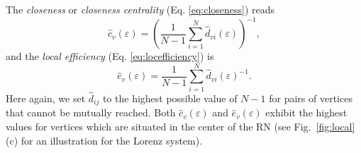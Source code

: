 The \textit{closeness} or \textit{closeness centrality} (Eq. \eqref{eq:closeness}) reads 
\begin{equation}
\hat{c}_v(\varepsilon)=\left(\frac{1}{N-1}\sum_{i=1}^N \hat{d}_{vi}(\varepsilon) \right)^{-1},
\label{eq:closenessRN}
\end{equation}
\noindent
and the \textit{local efficiency} (Eq. \eqref{eq:locefficiency}) is 
\begin{equation}
\hat{e}_v(\varepsilon)=\frac{1}{N-1}\sum_{i=1}^N \hat{d}_{vi}(\varepsilon)^{-1}. 
\label{eq:locefficiencyRN}
\end{equation}
\noindent
Here again, we set $\hat{d}_{ij}$ to the highest possible value of $N-1$ for pairs of vertices that cannot be mutually reached. Both $\hat{c}_v(\varepsilon)$ and $\hat{e}_v(\varepsilon)$ exhibit the highest values for vertices which are situated in the center of the RN (see Fig.~\ref{fig:local}(c) for an illustration for the Lorenz system).

